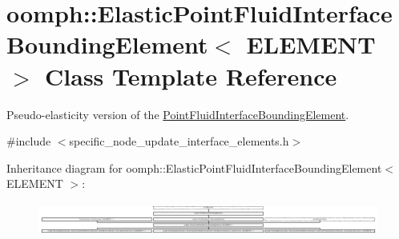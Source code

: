 \hypertarget{classoomph_1_1ElasticPointFluidInterfaceBoundingElement}{}\section{oomph\+:\+:Elastic\+Point\+Fluid\+Interface\+Bounding\+Element$<$ E\+L\+E\+M\+E\+NT $>$ Class Template Reference}
\label{classoomph_1_1ElasticPointFluidInterfaceBoundingElement}


Pseudo-\/elasticity version of the \hyperlink{classoomph_1_1PointFluidInterfaceBoundingElement}{Point\+Fluid\+Interface\+Bounding\+Element}.  




{\ttfamily \#include $<$specific\+\_\+node\+\_\+update\+\_\+interface\+\_\+elements.\+h$>$}

Inheritance diagram for oomph\+:\+:Elastic\+Point\+Fluid\+Interface\+Bounding\+Element$<$ E\+L\+E\+M\+E\+NT $>$\+:\begin{figure}[H]
\begin{center}
\leavevmode
\includegraphics[height=1.092896cm]{classoomph_1_1ElasticPointFluidInterfaceBoundingElement}
\end{center}
\end{figure}
